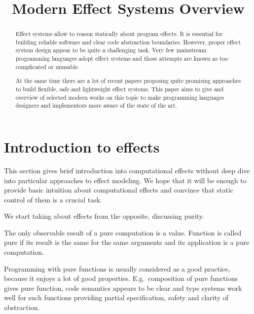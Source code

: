 \documentclass[conference]{IEEEtran}
\begin{document}
    \title{Modern Effect Systems Overview
    }

    \author{
    }

    \maketitle


    \begin{abstract}
        Effect systems allow to reason statically about program effects.
        It is essential for building reliable software and clear code abstraction boundaries.
        However, proper effect system design appear to be quite a challenging task.
        Very few mainstream programming languages adopt effect systems and those attempts are known as too complicated or unusable.

        At the same time there are a lot of recent papers proposing quite promising approaches to build flexible, safe and lightweight effect systems.
        This paper aims to give and overview of selected modern works on this topic to make programming languages designers and implementors more aware of the state of the art.
    \end{abstract}


    \section{Introduction to effects}

    This section gives brief introduction into computational effects without deep dive into particular approaches to effect modeling.
    We hope that it will be enough to provide basic intuition about computational effects and convince that static control of them is a crucial task.

    We start taking about effects from the opposite, discussing purity.

    The only observable result of a pure computation is a value.
    Function is called pure if its result is the same for the same arguments and its application is a pure computation.

    Programming with pure functions is usually considered as a good practice, because it enjoys a lot of good properties.
    E.g.\ composition of pure functions gives pure function, code semantics appears to be clear and type systems work well for such functions providing partial specification, safety and clarity of abstraction.
\end{document}

